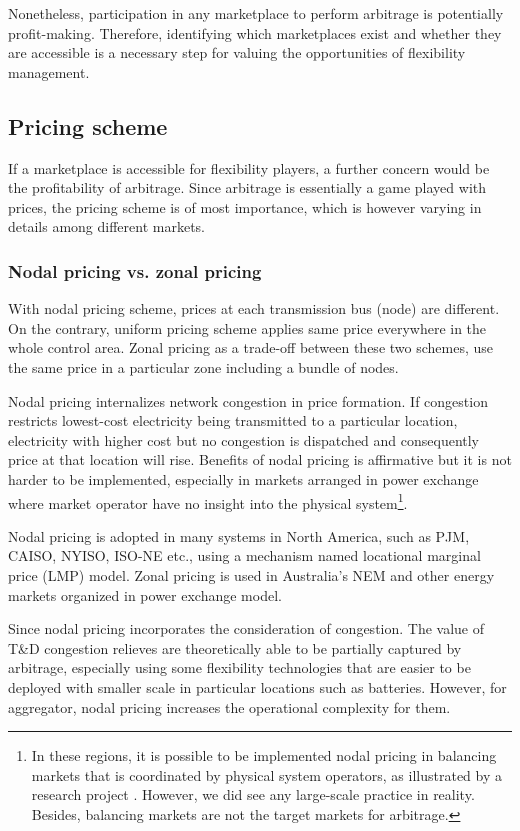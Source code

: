 Nonetheless, participation in any marketplace to perform arbitrage is potentially profit-making. Therefore, identifying which marketplaces exist and whether they are accessible is a necessary step for valuing the opportunities of flexibility management.

\subsection{Pricing scheme}
If a marketplace is accessible for flexibility players, a further concern would be the profitability of arbitrage. Since arbitrage is essentially a game played with prices, the pricing scheme is of most importance, which is however varying in details among different markets.

\subsubsection{Nodal pricing vs. zonal pricing}
With nodal pricing scheme, prices at each transmission bus (node) are different. On the contrary, uniform pricing scheme applies same price everywhere in the whole control area. Zonal pricing as a trade-off between these two schemes, use the same price in a particular zone including a bundle of nodes.

Nodal pricing internalizes network congestion in price formation. If congestion restricts lowest-cost electricity being transmitted to a particular location, electricity with higher cost but no congestion is dispatched and consequently price at that location will rise. Benefits of nodal pricing is affirmative \cite{Wang2015} but it is not harder to be implemented, especially in markets arranged in power exchange where market operator have no insight into the physical system\footnote{In these regions, it is possible to be implemented nodal pricing in balancing markets that is coordinated by physical system operators, as illustrated by a research project \cite{Ecogrid}. However, we did see any large-scale practice in reality. Besides, balancing markets are not the target markets for arbitrage.}. 

Nodal pricing is adopted in many systems in North America, such as PJM, CAISO, NYISO, ISO-NE etc., using a mechanism named locational marginal price (LMP) model. Zonal pricing is used in Australia's NEM and other energy markets organized in power exchange model. 

Since nodal pricing incorporates the consideration of congestion. The value of T\&D congestion relieves are theoretically able to be partially captured by arbitrage, especially using some flexibility technologies that are easier to be deployed with smaller scale in particular locations such as batteries. However, for aggregator, nodal pricing increases the operational complexity for them.

